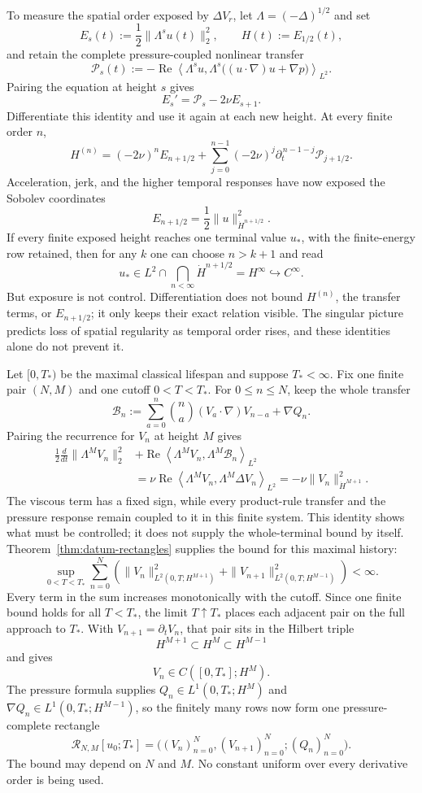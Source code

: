 To measure the spatial order exposed by \(\Delta V_r\), let
\(\Lambda=(-\Delta)^{1/2}\) and set
\[
 E_s(t):=\frac12\|\Lambda^su(t)\|_2^2,
 \qquad
 H(t):=E_{1/2}(t),
\]
and retain the complete pressure-coupled nonlinear transfer
\[
 \mathcal P_s(t)
 :=-\operatorname{Re}\left\langle
 \Lambda^su,
 \Lambda^s\bigl((u\!\cdot\nabla)u+\nabla p\bigr)
 \right\rangle_{L^2}.
\]
Pairing the equation at height \(s\) gives
\[
 E_s'=\mathcal P_s-2\nu E_{s+1}.
\]
Differentiate this identity and use it again at each new height.  At every
finite order \(n\),
\[
 H^{(n)}
 =(-2\nu)^nE_{n+1/2}
 +\sum_{j=0}^{n-1}(-2\nu)^j
   \partial_t^{\,n-1-j}\mathcal P_{j+1/2}.
\]
Acceleration, jerk, and the higher temporal responses have now exposed the
Sobolev coordinates
\[
 E_{n+1/2}
 =\frac12\|u\|_{\dot H^{n+1/2}}^2.
\]
If every finite exposed height reaches one terminal value \(u_*\), with the
finite-energy row retained, then for any \(k\) one can choose \(n>k+1\) and
read
\[
 u_*\in L^2\cap\bigcap_{n<\infty}\dot H^{n+1/2}
 =H^\infty
 \hookrightarrow C^\infty.
\]
But exposure is not control.  Differentiation does not bound
\(H^{(n)}\), the transfer terms, or \(E_{n+1/2}\); it only keeps their exact
relation visible.  The singular picture predicts loss of spatial regularity
as temporal order rises, and these identities alone do not prevent it.

Let \([0,T_*)\) be the maximal classical lifespan and suppose
\(T_*<\infty\).  Fix one finite pair \((N,M)\) and one cutoff
\(0<T<T_*\).  For \(0\le n\le N\), keep the whole transfer
\[
 \mathcal B_n
 :=\sum_{a=0}^{n}\binom na(V_a\!\cdot\nabla)V_{n-a}+\nabla Q_n.
\]
Pairing the recurrence for \(V_n\) at height \(M\) gives
\[
\begin{aligned}
 \frac12\frac{d}{dt}\|\Lambda^M V_n\|_2^2
 &+\operatorname{Re}\left\langle
   \Lambda^M V_n,\Lambda^M\mathcal B_n
  \right\rangle_{L^2}\\
 &=\nu\operatorname{Re}\left\langle
   \Lambda^M V_n,\Lambda^M\Delta V_n
  \right\rangle_{L^2}
 =-\nu\|V_n\|_{\dot H^{M+1}}^2.
\end{aligned}
\]
The viscous term has a fixed sign, while every product-rule transfer and the
pressure response remain coupled to it in this finite system.  This identity
shows what must be controlled; it does not supply the whole-terminal bound by
itself.  Theorem~\ref{thm:datum-rectangles} supplies the bound for this maximal
history:
\[
 \sup_{0<T<T_*}\sum_{n=0}^{N}\left(
  \|V_n\|_{L^2(0,T;H^{M+1})}^2
  +\|V_{n+1}\|_{L^2(0,T;H^{M-1})}^2
 \right)<\infty.
\]
Every term in the sum increases monotonically with the cutoff.  Since one
finite bound holds for all \(T<T_*\), the limit \(T\uparrow T_*\) places each
adjacent pair on the full approach to \(T_*\).  With
\(V_{n+1}=\partial_tV_n\), that pair sits in the Hilbert triple
\[
 H^{M+1}\subset H^M\subset H^{M-1}
\]
and gives
\[
 V_n\in C([0,T_*];H^M).
\]
The pressure formula supplies
\(Q_n\in L^1(0,T_*;H^M)\) and
\(\nabla Q_n\in L^1(0,T_*;H^{M-1})\), so the finitely many rows now form one
pressure-complete rectangle
\[
 \mathcal R_{N,M}[u_0;T_*]
 =\bigl((V_n)_{n=0}^{N},(V_{n+1})_{n=0}^{N};(Q_n)_{n=0}^{N}\bigr).
\]
The bound may depend on \(N\) and \(M\).  No constant uniform over every
derivative order is being used.

